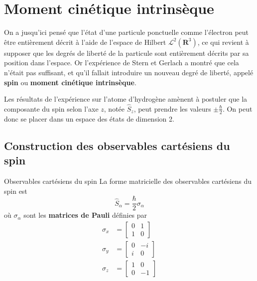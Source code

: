 \section{Moment cinétique intrinsèque}

    On a jusqu’ici pensé que l’état d’une particule ponctuelle comme l’électron peut être entièrement décrit à l’aide de l’espace de Hilbert $\mathcal{L}^2(\mathbf{R}^3)$, ce qui revient à supposer que les degrés de liberté de la particule sont entièrement décrits par sa position dans l’espace. Or l’expérience de Stern et Gerlach a montré que cela n’était pas suffisant, et qu’il fallait introduire un nouveau degré de liberté, appelé \textbf{spin} ou \textbf{moment cinétique intrinsèque}.

    Les résultats de l’expérience sur l’atome d’hydrogène amènent à postuler que la composante du spin selon l’axe $z$, notée $\hat{S}_z$, peut prendre les valeurs $\pm \frac{\hbar}{2}$. On peut donc se placer dans un espace des états de dimension 2.

    \subsection{Construction des observables cartésiens du spin}

        \begin{omed}{Observables cartésiens du spin}
            La forme matricielle des observables cartésiens du spin est 
            \[ \hat{S}_{\alpha} = \frac{\hbar}{2} \sigma_{\alpha} \]   
            où $\sigma_{\alpha}$ sont les \textbf{matrices de Pauli} définies par 
            \begin{align*}
                \sigma_x &= \begin{bmatrix}
                    0 & 1 \\
                    1 & 0
                \end{bmatrix} \\
                \sigma_y &= \begin{bmatrix}
                    0 & -i \\
                    i & 0
                \end{bmatrix} \\
                \sigma_z &= \begin{bmatrix}
                    1 & 0 \\
                    0 & -1
                \end{bmatrix} \\
            \end{align*}
        \end{omed}

